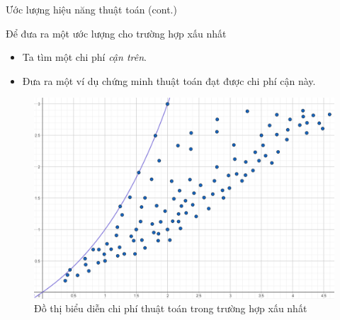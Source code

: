 \documentclass[10pt]{beamer}
\begin{document}
\begin{frame}{Ước lượng hiệu năng thuật toán (cont.)}
\begin{multicols}{2}
Để đưa ra một ước lượng cho trường hợp xấu nhất
\begin{itemize}
\item Ta tìm một chi phí \textit{cận trên}.
\item Đưa ra một ví dụ chứng minh thuật toán đạt được chi phí cận này.
\end{itemize}
\columnbreak
\begin{figure}
\centering
\includegraphics[width=\linewidth]{img/worst-case.png}
\caption{Đồ thị biểu diễn chi phí thuật toán trong trường hợp xấu nhất}
\end{figure}
\end{multicols}
\end{frame}
\end{document}
